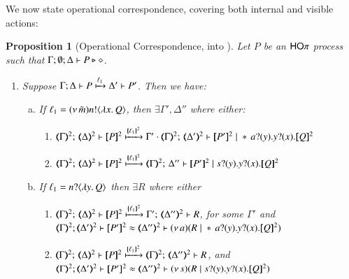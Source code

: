 \documentclass[preprint,11pt]{elsarticle}
\newtheorem{proposition}{Proposition}[section]
\begin{document}
{{We now state operational correspondence, covering both internal and visible actions:

\begin{proposition}[Operational Correspondence, \HOp into \sessp]\myrm
	\label{prop:op_corr_HOp_to_p}
	Let $P$ be an  $\mathsf{HO}\pi$ process such that  $\Gamma; \emptyset; \Delta \vdash P \triangleright \diamond$.
	
	\begin{enumerate}[1.]
		\item Suppose $\Gamma; \Delta \vdash P \xmapsto{\ell_1} \Delta' \vdash P'$.
		Then we have:
		\begin{enumerate}[a)]
			\item
				If  $\ell_1 = (\nu\, \tilde{m})n ! \langle \lambda x.\,Q \rangle$,
				then $\exists \Gamma', \Delta''$ where either:
				\begin{enumerate}[-]
					\item 
						$\tmap{\Gamma}{2};\, \tmap{\Delta}{2} \proves  \pmap{P}{2} 
						\hby{\mapa{\ell_1}^{2}}
						\Gamma' \cdot \tmap{\Gamma}{2};\, \tmap{\Delta'}{2} \proves \pmap{P'}{2} \Par \repl{} \binp{a}{y} \binp{y}{x} \pmap{Q}{2}$
					\item 
						$\tmap{\Gamma}{2};\, \tmap{\Delta}{2} \proves \pmap{P}{2} 
						\hby{\mapa{\ell_1}^{2}}
						\tmap{\Gamma}{2};\, \Delta'' \proves \pmap{P'}{2} \Par \binp{s}{y} \binp{y}{x} \pmap{Q}{2}$
				\end{enumerate}

			\item
				If   
				$\ell_1 = n ? \langle \lambda y.\,Q \rangle$
				then $\exists R$ where
				either
				\begin{enumerate}[-]
					\item 
						$\tmap{\Gamma}{2};\, \tmap{\Delta}{2} \proves \pmap{P}{2} 
						\hby{\mapa{\ell_1}^{2}}
						\Gamma';\, \tmap{\Delta''}{2} \proves  R$, for some $ \Gamma'$
						and \\ 
						$\horel{\tmap{\Gamma}{2}}{\tmap{\Delta'}{2}}{\pmap{P'}{2}}{\wb}{\tmap{\Delta''}{2}}{\newsp{a}{R \Par \repl{} \binp{a}{y} \binp{y}{x} \pmap{Q}{2}}}$
					\item 
						$\tmap{\Gamma}{2};\, \tmap{\Delta}{2} \proves \pmap{P}{2}
						\hby{\mapa{\ell_1}^{2}}
						\tmap{\Gamma}{2};\, \tmap{\Delta''}{2} \proves R$, 
						and \\ 
						$\horel{\tmap{\Gamma}{2}}{\tmap{\Delta'}{2}}{\pmap{P'}{2}}{\wb}{\tmap{\Delta''}{2}}{\newsp{s}{R \Par \binp{s}{y} \binp{y}{x} \pmap{Q}{2}}}$  		
				\end{enumerate}


\end{enumerate}
\end{enumerate}
\end{proposition}}}
\end{document}
